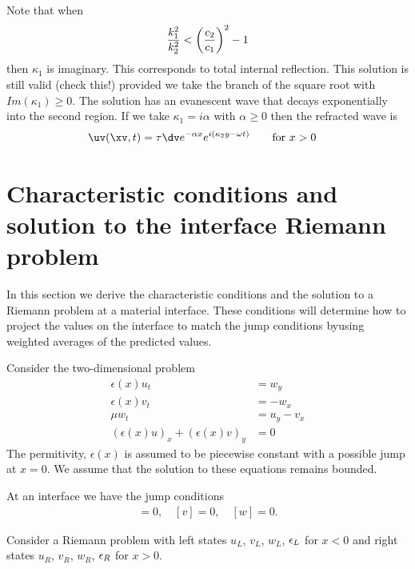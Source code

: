 Note that when
\[
     {k_1^2\over k_2^2} < \left({c_2\over c_1}\right)^2 - 1 
\]
then $\kappa_1$ is imaginary. This corresponds to total internal reflection.
This solution is still valid (check this!) provided we take the branch 
of the square root with $Im(\kappa_1)\ge 0$. The solution has an evanescent wave that decays
exponentially into the second region. If we take  $\kappa_1=i\alpha$ with $\alpha\ge 0$
then the refracted wave is 
\begin{align*}
  \uv(\xv,t) &= \tau \dv e^{-\alpha x} e^{ i (\kappa_2 y - \omega t)} \qquad\mbox{for $x>0$}
\end{align*}



\section{Characteristic conditions and solution to the interface Riemann problem}


In this section we derive the characteristic conditions and the solution
to a Riemann problem at a material interface. These conditions will determine how to
project the values on the interface to match the jump conditions byusing weighted
averages of the predicted values. 

Consider the two-dimensional problem 
\begin{align}
  \epsilon(x) u_t & = w_y \label{eq:u} \\
  \epsilon(x) v_t &= -w_x \label{eq:v} \\
  \mu w_t &= u_y - v_x  \label{eq:w} \\
  (\epsilon(x) u)_x + (\epsilon(x) v)_y &= 0 \label{eq:div}
\end{align}
The permitivity, $\epsilon(x)$ is assumed to be piecewise constant with a possible jump at $x=0$.
We assume that the solution to these equations remains bounded.

At an interface we have the jump conditions
\begin{align*}
    [\eps u]=0, \quad [v]=0, \quad [w]=0.
\end{align*}

Consider a Riemann problem with left states $u_L$, $v_L$, $w_L$, $\epsilon_L$ for $x<0$ and
right states $u_R$, $v_R$, $w_R$, $\epsilon_R$ for $x>0$.

